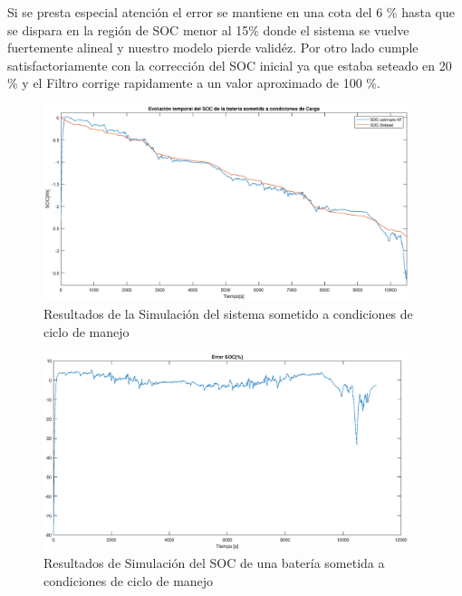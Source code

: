 \documentclass[10pt,a4paper]{article}
\begin{document}
Si se presta especial atención el error se mantiene en una cota del 6 \% hasta
que se dispara en la región de SOC menor al 15\% donde el sistema se vuelve
fuertemente alineal y nuestro modelo pierde validéz. Por otro lado cumple
satisfactoriamente con la corrección del SOC inicial ya que estaba seteado en 20
\% y el Filtro corrige rapidamente a un valor aproximado de 100 \%. 

\begin{figure}[h!]
    \begin{center}
	\includegraphics[width=0.95\textwidth]{Drive_Cycle_1_sim.eps}
	\caption{Resultados de la Simulación del sistema sometido a condiciones de
	ciclo de manejo}
	\label{Drive_Cycle_1_SOC_sim}
    \end{center}
\end{figure}

\begin{figure}[h!]
    \begin{center}
	\includegraphics[width=0.95\textwidth]{soc_error_porc.eps}
	\caption{Resultados de Simulación del SOC de una batería sometida a
	condiciones de ciclo de manejo}
	\label{error_SOC_Sim}
    \end{center}
\end{figure}
\FloatBarrier
\end{document}
